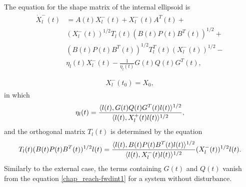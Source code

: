 \documentclass[letterpaper,10pt,english]{sphinxmanual}
\begin{document}
The equation for the shape matrix of the internal ellipsoid is
\label{chap_reach:equation-fwdint1}\begin{gather}
\begin{split}\dot{X}^-_l(t) & = A(t)X^-_l(t) + X^-_l(t)A^T(t) +\nonumber \\
& (X_l^{-}(t))^{1/2}T_l(t)(B(t)P(t)B^T(t))^{1/2} +\nonumber \\
& (B(t)P(t)B^T(t))^{1/2}T_l^T(t)(X_l^{-}(t))^{1/2} -\nonumber \\
& \eta_l(t)X^-_l(t) - \frac{1}{\eta_l(t)}G(t)Q(t)G^T(t), \\\end{split}\label{chap_reach-fwdint1}
\end{gather}\label{chap_reach:equation-fwdint2}\begin{gather}
\begin{split}X^-_l(t_0) = X_0,\end{split}\label{chap_reach-fwdint2}
\end{gather}
in which
\begin{gather}
\begin{split}\eta_l(t) = \frac{\langle l(t),
G(t)Q(t)G^T(t)l(t)\rangle^{1/2}}{\langle l(t), X^+_l(t)l(t)\rangle^{1/2}},\end{split}\notag
\end{gather}
and the orthogonal matrix \(T_l(t)\) is determined by the equation
\begin{gather}
\begin{split}T_l(t)(B(t)P(t)B^T(t))^{1/2}l(t) = \frac{\langle l(t),
B(t)P(t)B^T(t)l(t)\rangle^{1/2}}{\langle l(t),
X_l^-(t)l(t)\rangle^{1/2}}(X_l^{-}(t))^{1/2}l(t).\end{split}\notag
\end{gather}
Similarly to the external case, the terms containing \(G(t)\) and
\(Q(t)\) vanish from the equation \eqref{chap_reach-fwdint1} for a system without
disturbance.
\end{document}
